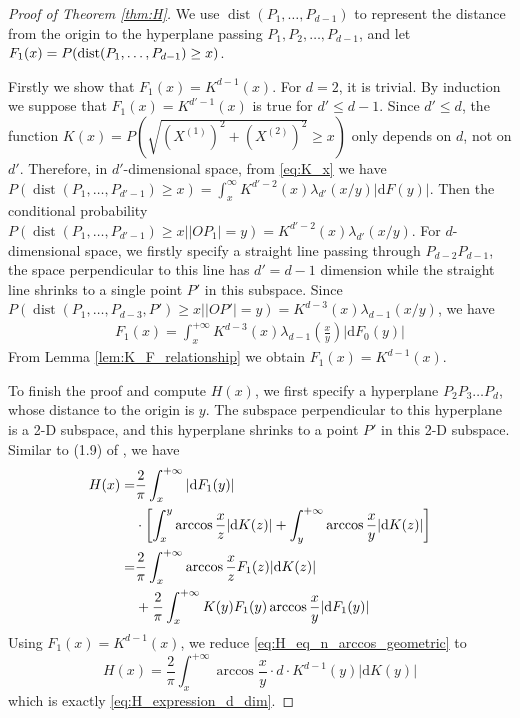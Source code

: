 \documentclass[conference,a4paper]{IEEEtran}
\DeclareMathOperator{\dist}{dist}
\def\dd{\mathrm{d}}
\begin{document}
\begin{proof}[Proof of Theorem \ref{thm:H}]
     
We use $\dist(P_1,\dots, P_{d-1})$ to represent
the distance from the origin to the hyperplane passing $P_1,P_2,\dots, P_{d-1}$,
and let $F_1(x)=P(\dist(P_1,\dots, P_{d-1})\linebreak\geq x)$.


Firstly we show that $F_1(x)=K^{d-1}(x)$.
For $d=2$, it is trivial.
By induction we suppose that $F_1(x)=K^{d'-1}(x)$ is true for
$d'\leq d-1$.
Since $d'\leq d$,
the function $K(x)=P(\sqrt{(X^{(1)})^2 + (X^{(2)})^2} \geq x)$
only depends on $d$,
not on $d'$.
Therefore, in $d'$-dimensional space,
from \eqref{eq:K_x} we have $
P(\dist(P_1, \dots, P_{d'-1})\geq x) = \int_{x}^{\infty} K^{d'-2}(x)\lambda_{d'}(x/y)|\dd F(y)|
$.
Then the conditional probability $P(\dist(P_1,\dots, P_{d'-1})\geq x \Big\vert |OP_1|=y)
=K^{d'-2}(x)\lambda_{d'}(x/y)$.
For $d$-dimensional space, 
we firstly specify a straight line passing through $P_{d-2}P_{d-1}$,
the space perpendicular 
to this line has $d'=d-1$ dimension while the straight line shrinks to a single point $P'$
in this subspace. Since
$P(\dist(P_1,\dots,P_{d-3},P')\geq x \Big\vert |OP'|=y)=
K^{d-3}(x)\lambda_{d-1}(x/y)$,
we have
\begin{align*}
    F_1(x) = \int_x^{+\infty} K^{d-3}(x) \lambda_{d-1}(\frac{x}{y})|\dd F_0(y)|
\end{align*}
From Lemma \ref{lem:K_F_relationship} we obtain $F_1(x) = K^{d-1}(x)$.

To finish the proof and compute $H(x)$, we first specify a hyperplane $P_2P_3\dots P_{d}$,
whose distance to the origin is $y$. The subspace perpendicular to this hyperplane is a 2-D subspace,
and this hyperplane shrinks to a point $P'$ in this 2-D subspace.
Similar to (1.9) of \cite{carnal1970konvexe}, we have
\begin{align}
     H(x) =& \frac{2}{\pi}\int_x^{+\infty}|\dd F_1(y)|\notag\\
     &\cdot\left[ \int_x^y \arccos\frac{x}{z}|\dd K(z)|
     +\int_y^{+\infty}\arccos\frac{x}{y} |\dd K(z)|\right]\notag\\
     =&\frac{2}{\pi}\int_x^{+\infty} \arccos\frac{x}{z}
     F_1(z)|\dd K(z)|\notag \\
     &+\frac{2}{\pi}\int_{x}^{+\infty} K(y)F_1(y)\arccos\frac{x}{y}|\dd F_1(y)| \label{eq:H_eq_n_arccos_geometric}
 \end{align}
Using $F_1(x)=K^{d-1}(x)$,
we reduce \eqref{eq:H_eq_n_arccos_geometric} to
 $$
 H(x) = \frac{2}{\pi}\int_x^{+\infty}  \arccos\frac{x}{y}\cdot
 d\cdot  K^{d-1}(y) |\dd K(y)|
 $$
 which is exactly \eqref{eq:H_expression_d_dim}.
 
\end{proof}
\end{document}
